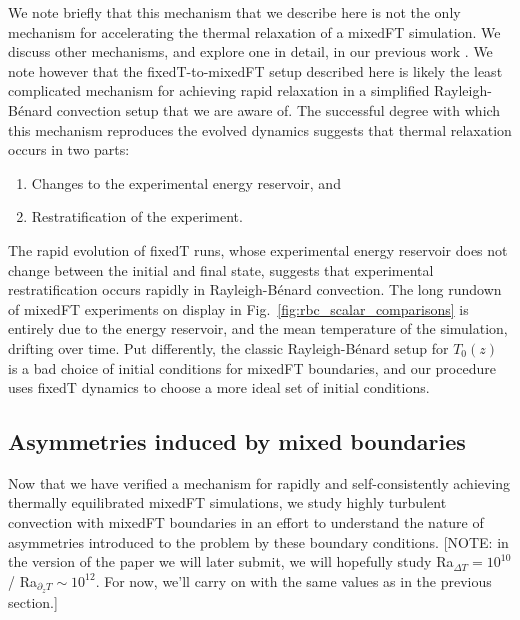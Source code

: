 \documentclass[aps, pre, onecolumn, nofootinbib, notitlepage, groupedaddress, amsfonts, amssymb, amsmath, longbibliography]{revtex4-1}
\newcommand{\RB}{Rayleigh-B\'{e}nard }
\begin{document}
We note briefly that this mechanism that we describe here is not the only mechanism for accelerating the thermal relaxation of a mixedFT simulation.
We discuss other mechanisms, and explore one in detail, in our previous work \cite{anders&all2018}.
We note however that the fixedT-to-mixedFT setup described here is likely the least complicated mechanism for achieving rapid relaxation in a simplified \RB convection setup that we are aware of.
The successful degree with which this mechanism reproduces the evolved dynamics suggests that thermal relaxation occurs in two parts:
\begin{enumerate}
\item Changes to the experimental energy reservoir, and
\item Restratification of the experiment.
\end{enumerate}
The rapid evolution of fixedT runs, whose experimental energy reservoir does not change between the initial and final state, suggests that experimental restratification occurs rapidly in \RB convection.
The long rundown of mixedFT experiments on display in Fig.~\ref{fig:rbc_scalar_comparisons} is entirely due to the energy reservoir, and the mean temperature of the simulation, drifting over time.
Put differently, the classic \RB setup for $T_0(z)$ is a bad choice of initial conditions for mixedFT boundaries, and our procedure uses fixedT dynamics to choose a more ideal set of initial conditions.

\subsection{Asymmetries induced by mixed boundaries}
\label{sec:asymmetries}
Now that we have verified a mechanism for rapidly and self-consistently achieving thermally equilibrated mixedFT simulations, we study highly turbulent convection with mixedFT boundaries in an effort to understand the nature of asymmetries introduced to the problem by these boundary conditions.
[NOTE: in the version of the paper we will later submit, we will hopefully study Ra$_{\Delta T} = 10^{10}$ / Ra$_{\partial_z T} \sim 10^{12}$. For now, we'll carry on with the same values as in the previous section.]
\end{document}
